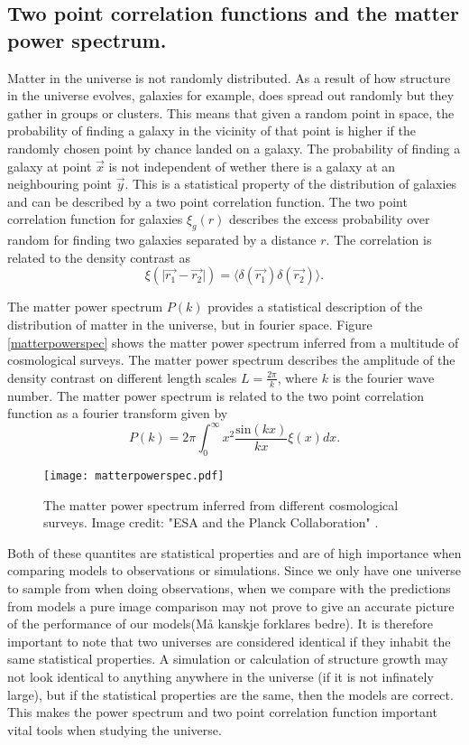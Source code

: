 \subsection{Two point correlation functions and the matter power spectrum.}
Matter in the universe is not randomly distributed. As a result of how structure in the universe evolves, galaxies for example,
does spread out randomly but they gather in groups or clusters. This means that given a random point in space, the probability of finding
a galaxy in the vicinity of that point is higher if the randomly chosen point by chance landed on a galaxy. The probability of finding a galaxy
at point $\vec{x}$ is not independent of wether there is a galaxy at an neighbouring point $\vec{y}$. This is a statistical property of the distribution
of galaxies and can be described by a two point correlation function. The two point correlation function for galaxies $\xi_{g}(r)$ describes the excess probability
over random for finding two galaxies separated by a distance $r$. The correlation is related to the density contrast as
\begin{equation}
    \xi(\vert\vec{r_1}-\vec{r_2}\vert)=\langle\delta(\vec{r_1})\delta(\vec{r_2})\rangle.
\end{equation}

The matter power spectrum $P(k)$ provides a statistical description of the
distribution of matter in the universe, but in fourier space. Figure
\ref{matterpowerspec} shows the matter power spectrum inferred from a multitude
of cosmological surveys. The matter power spectrum describes the amplitude of 
the density contrast on different length scales $L=\frac{2\pi}{k}$, where $k$ is
the fourier wave number. The matter power spectrum is related to the two point
correlation function as a fourier transform given by
\begin{equation}
    P(k)=2\pi\int_0^\infty x^2\frac{\mathrm{sin}(kx)}{kx}\xi(x)dx.
\end{equation}
\begin{figure}[htbp]\label{fig:matterpowerspec}
    \texttt{[image: matterpowerspec.pdf]}
    \caption{The matter power spectrum inferred from different cosmological surveys. Image credit: "ESA and the Planck Collaboration" \cite{2020}.}
\end{figure}
Both of these quantites are statistical properties and are of high importance
when comparing models to observations or simulations. Since we only have one
universe to sample from when doing observations, when we compare with the
predictions from models a pure image comparison may not prove to give an
accurate picture of the performance of our models(Må kanskje forklares bedre). It is therefore important to
note that two universes are considered identical if they inhabit the same
statistical properties. A simulation or calculation of structure growth may
not look identical to anything anywhere in the universe (if it is not infinately
large), but if the statistical properties are the same, then the models are
correct. This makes the power spectrum and two point correlation function
important vital tools when studying the universe.
